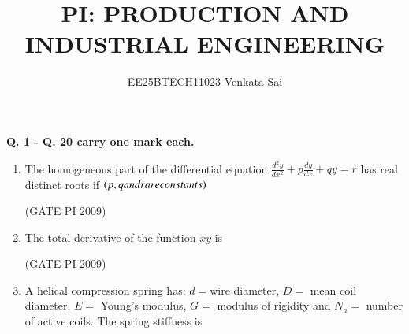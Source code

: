 \documentclass[journal,12pt,onecolumn]{IEEEtran}
\title{PI: PRODUCTION AND INDUSTRIAL ENGINEERING}
\author{EE25BTECH11023-Venkata Sai}
\theoremstyle{remark}
\begin{document}
\maketitle
 
\textbf{Q. 1 - Q. 20 carry one mark each.}

\begin{enumerate}

\item The homogeneous part of the differential equation
$\frac{d^2 y}{dx^2} + p \frac{dy}{dx} + q y = r$
has real distinct roots if $\left(p, q and r are constants\right)$
\begin{enumerate}
\end{enumerate}
\hfill (GATE PI 2009) 
\item The total derivative of the function $xy$ is
\begin{enumerate}
\end{enumerate}
\hfill (GATE PI 2009) 
\item A helical compression spring has: $ d = $wire diameter, $ D = $ mean coil diameter, $ E = $ Young's modulus, $ G = $ modulus of rigidity and $ N_a = $ number of active coils. The spring stiffness is
\begin{enumerate}
\end{enumerate}
\end{enumerate}
\end{document}
